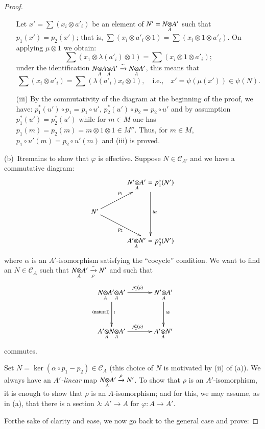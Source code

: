 \begin{proof}
\begin{itemize}
Let $x'=\sum(x_{i}\otimes a'_{i})$ be an element of
$N'=\foprod{N}{A'}{A}$ such that $p_{1}(x')=p_{2}(x')$; that is,
$\sum(x_{i}\otimes a'_{i}\otimes 1)=\sum (x_{i}\otimes 1\otimes
a'_{i})$. On applying $\mu\otimes 1$ we obtain:
$$
\sum(x_{1}\otimes\lambda(a'_{i})\otimes 1)=\sum(x_{i}\otimes 1\otimes a'_{i});
$$
under the identification
$\foprod{N}{\foprod{A}{A'}{A}}{A}\xrightarrow{\sim}\foprod{N}{A'}{A}$,
this means that
$$
\sum(x_{i}\otimes a'_{i})=\sum(\lambda(a'_{i})x_{i}\otimes
1),\quad\text{i.e.,}\quad x'=\psi(\mu(x'))\in\psi(N).
$$

\item[(iii)] By the commutativity of the diagram at the beginning of
  the proof, we have: $p^{\ast}_{1}(u')\circ p_{1}=p_{1}\circ u'$,
  $p^{\ast}_{2}(u')\circ p_{2}=p_{2}\circ u'$ and by assumption
  $p^{\ast}_{1}(u')=p^{\ast}_{2}(u')$ while for $m\in M$ one has
  $p_{1}(m)=p_{2}(m)=m\otimes 1\otimes 1\in M''$. Thus, for $m\in M$,
  $p_{1}\circ u'(m)=p_{2}\circ u'(m)$ and (iii) is proved.
\end{itemize}

\noindent
(b)~It\pageoriginale remains to show that $\varphi$ is effective. Suppose $N\in
\mathscr{C}_{A'}$ and we have a commutative diagram:
\[
\xymatrix@C=1.2cm{
 & \foprod{N'}{A'}{A}=p^{\ast}_{1}(N')\ar[dd]^{\wr \alpha}\\
N'\ar[ur]^{p_{1}}\ar[dr]_{p_{2}} &\\
 & \foprod{A'}{N'}{A}=p^{\ast}_{2}(N')
}
\]
where $\alpha$ is an $A'$-isomorphism satisfying the ``cocycle''
condition. We want to find an $N\in\mathscr{C}_{A}$ such that
$\foprod{N}{A'}{A}\xrightarrow[\rho]{\sim}N'$ and such that
\[
\xymatrix@=1.2cm{
\foprod{N}{\foprod{A'}{A'}{A}}{A}\ar[d]^{\wr}_{\text{(natural)}}\ar[r]^{p^{\ast}_{1}(\rho)}
& \foprod{N'}{A'}{A}\ar[d]^{\wr \alpha}\\
\foprod{A'}{\foprod{N}{A'}{A}}{A}\ar[r]^{p^{\ast}_{2}(\rho)} &
\foprod{A'}{N'}{A} 
}
\]
commutes.

Set $N=\ker (\alpha\circ p_{1}-p_{2})\in\mathscr{C}_{A}$ (this choice
of $N$ is motivated by (ii) of (a)). We always have an
{\em $A'$-linear} map $\foprod{N}{A'}{A}\xrightarrow{\rho}N'$. To show
that $\rho$ is an $A'$-isomorphism, it is enough to show that $\rho$
is an $A$-isomorphism; and for this, we may assume, as in (a), that
there is a section $\lambda:A'\to A$ for $\varphi:A\to A'$.  

For\pageoriginale the sake of clarity and ease, we now go back to the
general case and prove:
\end{proof}

